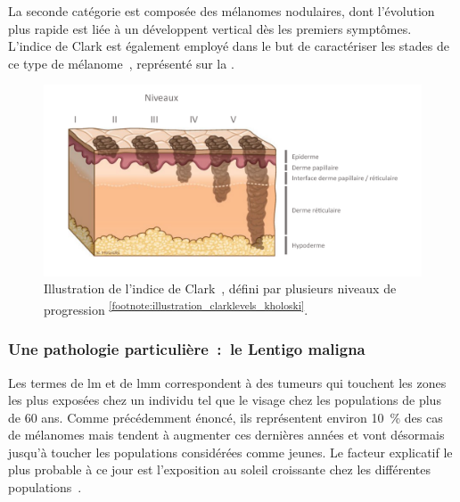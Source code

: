 La seconde catégorie est composée des mélanomes nodulaires, dont l'évolution plus rapide est liée à un développent vertical dès les premiers symptômes. L'indice de Clark est également employé dans le but de caractériser les stades de ce type de mélanome~\cite{Clark1969}, représenté sur la .\par

\begin{figure}[H]
    \centering
    \includegraphics[width=0.9\linewidth]{contents/chapter_1/resources/illustration_clarklevels_kholoski.pdf}
    \caption{Illustration de l'indice de Clark~\cite{Clark1969}, défini par plusieurs niveaux de progression \textsuperscript{\ref{footnote:illustration_clarklevels_kholoski}}.}
    \label{fig:illustration_clarklevels_kholoski}
\end{figure}\par

\addtocounter{footnote}{1}

\subsubsection{Une pathologie particulière~:~le Lentigo maligna}
\label{subsec:lentigo}
Les termes de \acrfull{lm} et de \acrfull{lmm} correspondent à des tumeurs qui touchent les zones les plus exposées chez un individu tel que le visage chez les populations de plus de 60 ans. Comme précédemment énoncé, ils représentent environ 10~\% des cas de mélanomes mais tendent à augmenter ces dernières années et vont désormais jusqu'à toucher les populations considérées comme jeunes. Le facteur explicatif le plus probable à ce jour est l'exposition au soleil croissante chez les différentes populations~\cite{Baccard2009, LeGal2011, LeDuff2014}.\par

